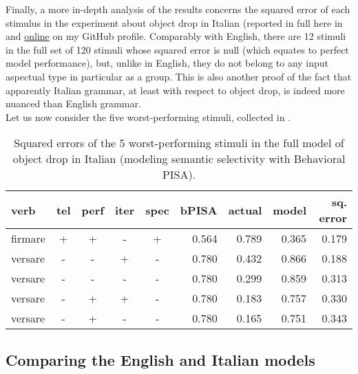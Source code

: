 Finally, a more in-depth analysis of the results concerns the squared error of each stimulus in the experiment about object drop in Italian (reported in full here in  and \href{https://github.com/giuliacappelli/dissertationData}{online} on my GitHub profile. Comparably with English, there are 12 stimuli in the full set of 120 stimuli whose squared error is null (which equates to perfect model performance), but, unlike in English, they do not belong to any input aspectual type in particular as a group. This is also another proof of the fact that apparently Italian grammar, at least with respect to object drop, is indeed more nuanced than English grammar.\\
Let us now consider the five worst-performing stimuli, collected in .


\begin{table}[htb] %
\caption{Squared errors of the 5 worst-performing stimuli in the full model of object drop in Italian (modeling semantic selectivity with Behavioral PISA).}
\begin{tabular}{l|ccccr|rrr}
\textbf{verb}  & \textbf{tel} & \textbf{perf} & \textbf{iter} & \textbf{spec} & \textbf{bPISA}   & \textbf{actual} & \textbf{model} & \textbf{sq. error} \\
\hline
firmare & +  & +   & -   & +     & 0.564 & 0.789  & 0.365     & 0.179         \\
versare & -  & -   & +   & -     & 0.780  & 0.432  & 0.866     & 0.188         \\
versare & -  & -   & -   & -     & 0.780  & 0.299  & 0.859     & 0.313         \\
versare & -  & +   & +   & -     & 0.780  & 0.183  & 0.757     & 0.330          \\
versare & -  & +   & -   & -     & 0.780  & 0.165  & 0.751     & 0.343        
\end{tabular}
\end{table}



			

\subsection{Comparing the English and Italian models} 

